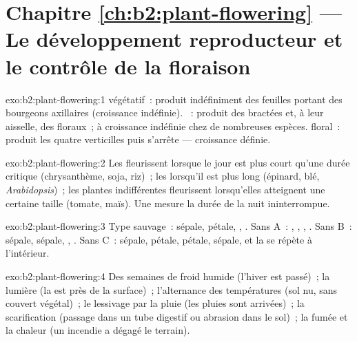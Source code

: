 \section*{Chapitre \ref{ch:b2:plant-flowering} --- Le développement reproducteur et le contrôle de la floraison}

\begin{solution}{exo:b2:plant-flowering:1}
 végétatif~: produit indéfiniment des feuilles portant des
bourgeons axillaires (croissance indéfinie). ~: produit des bractées et, à leur aisselle, des
 floraux~; à croissance indéfinie chez de nombreuses espèces.
 floral~: produit les quatre verticilles puis s'arrête ---
croissance définie.
\end{solution}

\begin{solution}{exo:b2:plant-flowering:2}
Les  fleurissent lorsque le jour est plus court
qu'une durée critique (chrysanthème, soja, riz)~; les  lorsqu'il est plus long (épinard, blé, \emph{Arabidopsis})~; les
plantes indifférentes fleurissent lorsqu'elles atteignent une certaine
taille (tomate, maïs). Une  mesure la durée de la
nuit ininterrompue.
\end{solution}

\begin{solution}{exo:b2:plant-flowering:3}
Type sauvage~: sépale, pétale, , . Sans A~: ,
, , . Sans B~: sépale, sépale, , .
Sans C~: sépale, pétale, pétale, sépale, et la  se répète à
l'intérieur.
\end{solution}

\begin{solution}{exo:b2:plant-flowering:4}
Des semaines de froid humide (l'hiver est passé)~; la lumière (la 
est près de la surface)~; l'alternance des températures (sol nu, sans
couvert végétal)~; le lessivage par la pluie (les pluies sont arrivées)~;
la scarification (passage dans un tube digestif ou abrasion dans le
sol)~; la fumée et la chaleur (un incendie a dégagé le terrain).
\end{solution}

